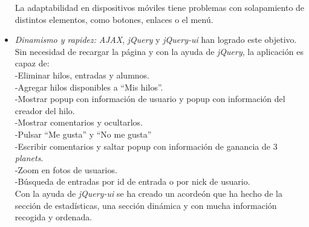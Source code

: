 \documentclass[a4paper, 12pt]{book}
\begin{document}
\begin{itemize}
  La adaptabilidad en dispositivos m\'oviles tiene problemas con solapamiento de distintos elementos, como botones, enlaces o el men\'u.
  \item \textit {Dinamismo y rapidez:} \textit{AJAX}, \textit{jQuery} y \textit{jQuery-ui} han logrado este objetivo. Sin necesidad de recargar la p\'agina y con la ayuda 
  de \textit{jQuery}, la aplicaci\'on es capaz de:\\
  -Eliminar hilos, entradas y alumnos.\\
  -Agregar hilos disponibles a ``Mis hilos''.\\
  -Mostrar popup con informaci\'on de usuario y popup con informaci\'on del creador del hilo.\\
  -Mostrar comentarios y ocultarlos.\\
  -Pulsar ``Me gusta'' y ``No me gusta''\\
  -Escribir comentarios y saltar popup con informaci\'on de ganancia de 3 \textit{planets}.\\
  -Zoom en fotos de usuarios.\\
  -B\'usqueda de entradas por id de entrada o por nick de usuario.\\
  Con la ayuda de \textit{jQuery-ui} se ha creado un acorde\'on que ha hecho de la secci\'on de estad\'isticas, una secci\'on din\'amica y con mucha informaci\'on recogida y 
  ordenada.
\end{itemize}
\end{document}
